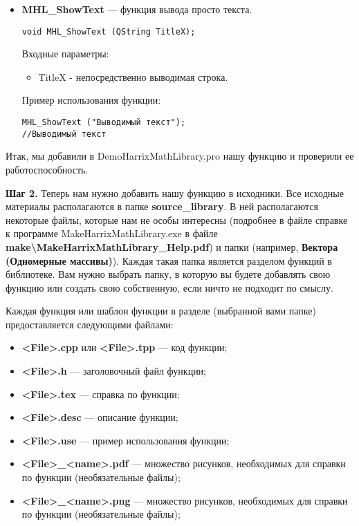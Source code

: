 \begin{itemize}
\item \textbf{MHL\_ShowText} --- функция вывода просто текста. 
\begin{lstlisting}[label=examplefunction14855, caption=Синтаксис функции MHL\_ShowText]
void MHL_ShowText (QString TitleX);
\end{lstlisting}
Входные параметры: 
\begin{itemize}   
     \item TitleX - непосредственно выводимая строка.
\end{itemize}
Пример использования функции:
\begin{lstlisting}[label=examplefunction14855, caption=Пример использования MHL\_ShowText]
MHL_ShowText ("Выводимый текст");
//Выводимый текст

\end{lstlisting}


\end{itemize}

Итак, мы добавили в DemoHarrixMathLibrary.pro нашу функцию и проверили ее работоспособность. 

\textbf{Шаг 2.}\label{step2} Теперь нам нужно добавить нашу функцию в исходники. Все исходные материалы располагаются в папке \textbf{source\_library}. В ней располагаются некоторые файлы, которые нам не особы интересны (подробнее в файле справке к программе MakeHarrixMathLibrary.exe в файле \textbf{make\textbackslash MakeHarrixMathLibrary\_Help.pdf}) и папки (например, \textbf{Вектора (Одномерные массивы)}). Каждая такая папка является разделом функций в библиотеке. Вам нужно выбрать папку, в которую вы будете добавлять свою функцию или создать свою собственную, если ничто не подходит по смыслу.

Каждая функция или шаблон функции в разделе (выбранной вами папке) предоставляется следующими файлами:
\begin{itemize}
\item \textbf{<File>.cpp} или \textbf{<File>.tpp} --- код функции;
\item \textbf{<File>.h} --- заголовочный файл функции;
\item \textbf{<File>.tex} --- справка по функции;
\item \textbf{<File>.desc} --- описание функции;
\item \textbf{<File>.use} --- пример использования функции;
\item \textbf{<File>\_<name>.pdf} --- множество рисунков, необходимых для справки по функции (необязательные файлы);
\item \textbf{<File>\_<name>.png} --- множество рисунков, необходимых для справки по функции (необязательные файлы);
\end{itemize}

